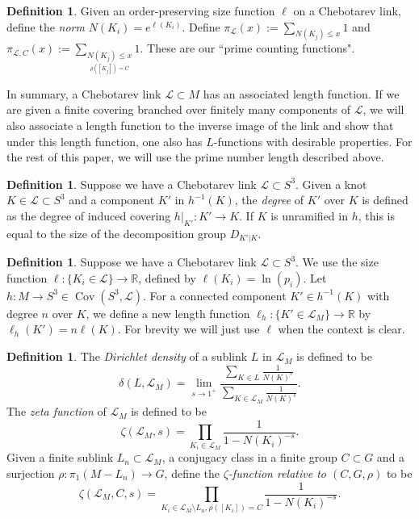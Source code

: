 \documentclass{amsart}
\theoremstyle{plain}
\theoremstyle{definition}
\newtheorem{Def}[theorem]{Definition}
\theoremstyle{plain}
\theoremstyle{plain}
\theoremstyle{plain}
\theoremstyle{remark}
\theoremstyle{remark}
\theoremstyle{plain}
\theoremstyle{definition}
\theoremstyle{plain}
\DeclareMathOperator{\Cov}{\mathrm{Cov}}
\theoremstyle{plain}
\theoremstyle{plain}
\numberwithin{equation}{section}
\begin{document}
\begin{Def}\label{def:norm}
Given an order-preserving size function $\ell$ on a Chebotarev link, define the \emph{norm} $N(K_i) = e^{\ell(K_i)}$. Define $\pi_{\mathcal{L}}(x):=\underset{N(K_j)\leq x}{\sum}1$ and $\pi_{\mathcal{L},C}(x):=\underset{\underset{\rho([K_j])=C}{N(K_j)\leq x}}{\sum}1$. These are our ``prime counting functions". 
\end{Def}

In summary, a Chebotarev link $\mathcal{L} \subset M$ has an associated length function. If we are given a finite covering branched over finitely many components of $\mathcal{L}$, we will also associate a length function to the inverse image of the link and show that under this length function, one also has $L$-functions with desirable properties. For the rest of this paper, we will use the prime number length described above.

\begin{Def}
Suppose we have a Chebotarev link $\mathcal{L} \subset S^3$. Given a knot $K \in \mathcal{L} \subset S^3$ and a component $K'$ in $h^{-1}(K)$, the \emph{degree} of $K'$ over $K$ is defined as the degree of induced covering $h|_{K'}: K' \to K$. If $K$ is unramified in $h$, this is equal to the size of the decomposition group $D_{K'|K}$.
\end{Def}

\begin{Def}
Suppose we have a Chebotarev link $\mathcal{L} \subset S^3$. We use the size function $\ell: \{K_i \in \mathcal{L}\} \rightarrow \mathbb{R}$, defined by $\ell(K_i) = \ln(p_i)$. Let $h: M \rightarrow S^3 \in \Cov(S^3, \mathcal{L})$. For a connected component $K' \in h^{-1}(K)$ with degree $n$ over $K$, we define a new length function $\ell_h: \{K' \in \mathcal{L}_M\} \rightarrow \mathbb{R}$ by $\ell_h(K') = n\ell(K)$. For brevity we will just use $\ell$ when the context is clear.
\end{Def}

\begin{Def}\label{def:dirichlet}
The \emph{Dirichlet density} of a sublink $L$ in $\mathcal{L}_M$ is defined to be 
\begin{equation}
    \delta(L, \mathcal{L}_M) = \lim_{s \to 1^+} \frac{\sum_{K \in L}\frac{1}{N(K)^s}}{\sum_{K \in \mathcal{L}_M}\frac{1}{N(K)^s}}.
\end{equation}
The \emph{zeta function} of $\mathcal{L}_M$ is defined to be 
\begin{equation}
    \zeta(\mathcal{L}_M, s) = \prod_{K_i \in \mathcal{L}_M}\frac{1}{1 - N(K_i)^{-s}}.
\end{equation}
Given a finite sublink $L_n \subset \mathcal{L}_M$, a conjugacy class in a finite group $C \subset G$ and a surjection $\rho: \pi_1(M - L_n) \to G$, define the \emph{$\zeta$-function relative to $(C, G, \rho)$} to be
\begin{equation}
    \zeta(\mathcal{L}_M, C, s) = \prod_{K_i \in \mathcal{L}_M \setminus L_n, \rho([K_i]) = C}\frac{1}{1 - N(K_i)^{-s}}.
\end{equation}
\end{Def}
\end{document}
